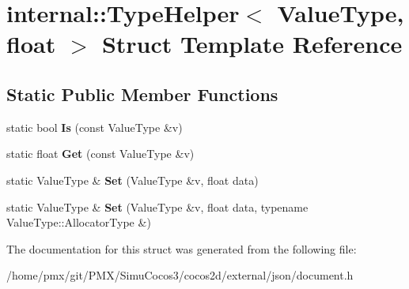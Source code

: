 \hypertarget{structinternal_1_1TypeHelper_3_01ValueType_00_01float_01_4}{}\section{internal\+:\+:Type\+Helper$<$ Value\+Type, float $>$ Struct Template Reference}
\label{structinternal_1_1TypeHelper_3_01ValueType_00_01float_01_4}
\subsection*{Static Public Member Functions}
\begin{DoxyCompactItemize}
\item 
\mbox{\label{structinternal_1_1TypeHelper_3_01ValueType_00_01float_01_4_a1108488a02868bb91c3c14f4598bbebc}} 
static bool {\bfseries Is} (const Value\+Type \&v)
\item 
\mbox{\label{structinternal_1_1TypeHelper_3_01ValueType_00_01float_01_4_aa681e0d25878a7a770b0be82322b435a}} 
static float {\bfseries Get} (const Value\+Type \&v)
\item 
\mbox{\label{structinternal_1_1TypeHelper_3_01ValueType_00_01float_01_4_a28318c2063421cf18dfa23d16352a3b8}} 
static Value\+Type \& {\bfseries Set} (Value\+Type \&v, float data)
\item 
\mbox{\label{structinternal_1_1TypeHelper_3_01ValueType_00_01float_01_4_a3a0d8783f6228504058c427a16687bdf}} 
static Value\+Type \& {\bfseries Set} (Value\+Type \&v, float data, typename Value\+Type\+::\+Allocator\+Type \&)
\end{DoxyCompactItemize}


The documentation for this struct was generated from the following file\+:\begin{DoxyCompactItemize}
\item 
/home/pmx/git/\+P\+M\+X/\+Simu\+Cocos3/cocos2d/external/json/document.\+h\end{DoxyCompactItemize}
